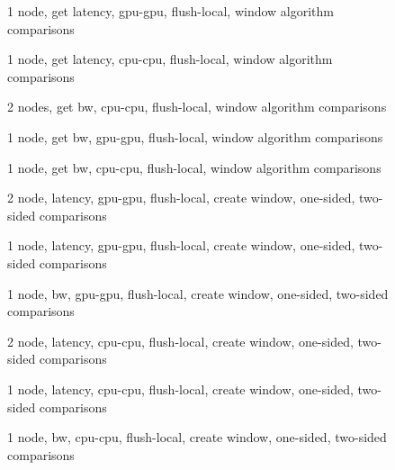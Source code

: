\documentclass[]{article}
\begin{document}
\begin{figure}
	
	\caption{1 node, get latency, gpu-gpu, flush-local, window algorithm comparisons}
\end{figure}

\begin{figure}
	
	\caption{1 node, get latency, cpu-cpu, flush-local, window algorithm comparisons}
\end{figure}

\begin{figure}
	
	\caption{2 nodes, get bw, cpu-cpu, flush-local, window algorithm comparisons}
\end{figure}

\begin{figure}
	
	\caption{1 node, get bw, gpu-gpu, flush-local, window algorithm comparisons}
\end{figure}

\begin{figure}
	
	\caption{1 node, get bw, cpu-cpu, flush-local, window algorithm comparisons}
\end{figure}

\begin{figure}
	
	\caption{2 node, latency, gpu-gpu, flush-local, create window, one-sided, two-sided comparisons}
\end{figure}

\begin{figure}
	
	\caption{1 node, latency, gpu-gpu, flush-local, create window, one-sided, two-sided comparisons}
\end{figure}

\begin{figure}
	
	\caption{1 node, bw, gpu-gpu, flush-local, create window, one-sided, two-sided comparisons}
\end{figure}

\begin{figure}
	
	\caption{2 node, latency, cpu-cpu, flush-local, create window, one-sided, two-sided comparisons}
\end{figure}

\begin{figure}
	
	\caption{1 node, latency, cpu-cpu, flush-local, create window, one-sided, two-sided comparisons}
\end{figure}

\begin{figure}
	
	\caption{1 node, bw, cpu-cpu, flush-local, create window, one-sided, two-sided comparisons}
\end{figure}
\end{document}
